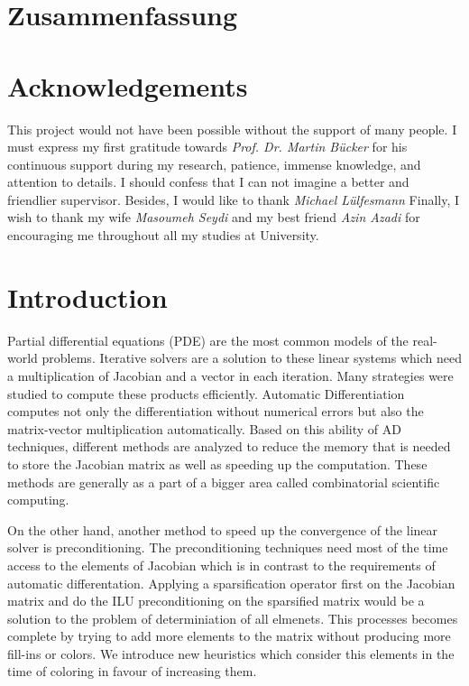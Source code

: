 \documentclass[12pt, oneside]{book}
\begin{document}
\chapter*{Zusammenfassung}
\chapter*{Acknowledgements}
\noindent This project would not have been possible without 
the support of many people. I must express my first gratitude 
towards \textit{Prof. Dr. Martin B\"ucker} for his continuous 
support during my research, patience, immense knowledge, 
and attention to details. 
I should confess that I can not imagine a better and friendlier supervisor.
Besides, I would like to thank \textit{Michael Lülfesmann}
Finally, I wish to thank my wife \textit{Masoumeh Seydi} and 
my best friend \textit{Azin Azadi}
for encouraging me throughout all my studies at University.

\tableofcontents
\chapter{Introduction}
Partial differential equations (PDE) are the most common models of the real-world problems. Iterative solvers are a solution to these linear systems which need a multiplication of Jacobian and a vector in each iteration. 
Many strategies were studied to compute these products efficiently.
Automatic Differentiation~\cite{Griewank2008EDP,Rall1981ADT} 
computes not only the differentiation without numerical errors but also the
matrix-vector multiplication automatically. 
Based on this ability of AD techniques, different methods are analyzed to 
reduce the memory that is needed to store the Jacobian matrix as well as
speeding up the computation. These methods are generally as a part of 
a bigger area called combinatorial scientific computing.

On the other hand, another method to speed up the convergence of the linear solver
is preconditioning. The preconditioning techniques need most of the time access to
the elements of Jacobian which is in contrast to the requirements of automatic differentation.
Applying a sparsification operator first on the Jacobian matrix and do the ILU preconditioning
on the sparsified matrix would be a solution to the problem of determiniation of 
all elmenets. This processes becomes complete by trying to add more elements to the matrix
without producing more fill-ins or colors. We introduce new heuristics which consider this
elements in the time of coloring in favour of increasing them.
\end{document}
